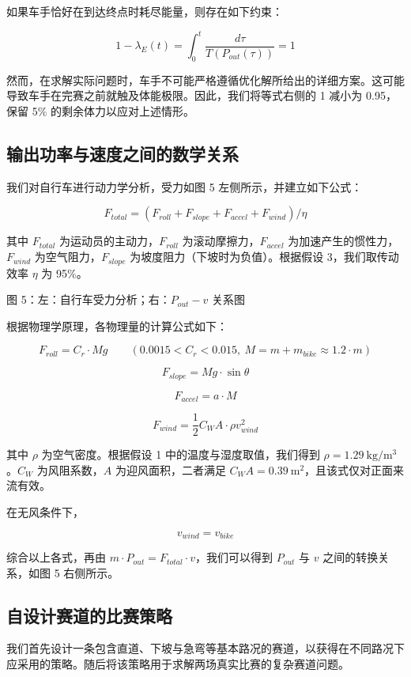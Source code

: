 \documentclass[11pt,a4paper]{ctexart}
\begin{document}
如果车手恰好在到达终点时耗尽能量，则存在如下约束：

\[
1-\lambda_E(t)=\int_0^{t}\frac{d\tau}{T\left(P_{out}(\tau)\right)}=1
\]

然而，在求解实际问题时，车手不可能严格遵循优化解所给出的详细方案。这可能导致车手在完赛之前就触及体能极限。因此，我们将等式右侧的 1 减小为 0.95，保留 5\% 的剩余体力以应对上述情形。

\subsection{输出功率与速度之间的数学关系}

我们对自行车进行动力学分析，受力如图 5 左侧所示，并建立如下公式：

\[
F_{total}=\left(F_{roll}+F_{slope}+F_{accel}+F_{wind}\right)/\eta
\]

其中 $F_{total}$ 为运动员的主动力，$F_{roll}$ 为滚动摩擦力，$F_{accel}$ 为加速产生的惯性力，$F_{wind}$ 为空气阻力，$F_{slope}$ 为坡度阻力（下坡时为负值）。根据假设 3，我们取传动效率 $\eta$ 为 95\%。

图 5：左：自行车受力分析；右：$P_{out}-v$ 关系图

根据物理学原理，各物理量的计算公式如下：

\[
F_{roll}=C_r\cdot Mg\qquad\left(0.0015<C_r<0.015,\ M=m+m_{bike}\approx 1.2\cdot m\right)
\]

\[
F_{slope}=Mg\cdot\sin\theta
\]

\[
F_{accel}=a\cdot M
\]

\[
F_{wind}=\frac{1}{2}C_W A\cdot\rho v_{wind}^{2}
\]

其中 $\rho$ 为空气密度。根据假设 1 中的温度与湿度取值，我们得到 $\rho=1.29\ \mathrm{kg/m^{3}}$。$C_W$ 为风阻系数，$A$ 为迎风面积，二者满足 $C_W A=0.39\ \mathrm{m^{2}}$，且该式仅对正面来流有效。

在无风条件下，

\[
v_{wind}=v_{bike}
\]

综合以上各式，再由 $m\cdot P_{out}=F_{total}\cdot v$，我们可以得到 $P_{out}$ 与 $v$ 之间的转换关系，如图 5 右侧所示。

\subsection{自设计赛道的比赛策略}

我们首先设计一条包含直道、下坡与急弯等基本路况的赛道，以获得在不同路况下应采用的策略。随后将该策略用于求解两场真实比赛的复杂赛道问题。
\end{document}
